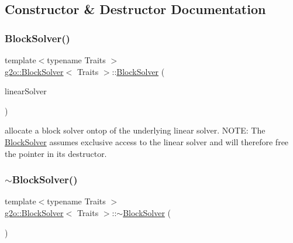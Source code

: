 \subsection{Constructor \& Destructor Documentation}
\mbox{\label{classg2o_1_1_block_solver_a04701a223a14708c9c84ce4d7e7af3f6}} 
\subsubsection{\texorpdfstring{Block\+Solver()}{BlockSolver()}}
{\footnotesize\ttfamily template$<$typename Traits $>$ \\
\mbox{\hyperlink{classg2o_1_1_block_solver}{g2o\+::\+Block\+Solver}}$<$ Traits $>$\+::\mbox{\hyperlink{classg2o_1_1_block_solver}{Block\+Solver}} (\begin{DoxyParamCaption}\item[{\mbox{\hyperlink{classg2o_1_1_block_solver_a717fa8cb1dd5a212e41d8ebef67955e6}{Linear\+Solver\+Type}} $\ast$}]{linear\+Solver }\end{DoxyParamCaption})}

allocate a block solver ontop of the underlying linear solver. N\+O\+TE\+: The \mbox{\hyperlink{classg2o_1_1_block_solver}{Block\+Solver}} assumes exclusive access to the linear solver and will therefore free the pointer in its destructor. \mbox{\label{classg2o_1_1_block_solver_a7587b13ec3494c00ad95a3d0ce7fd9a9}} 
\subsubsection{\texorpdfstring{$\sim$\+Block\+Solver()}{~BlockSolver()}}
{\footnotesize\ttfamily template$<$typename Traits $>$ \\
\mbox{\hyperlink{classg2o_1_1_block_solver}{g2o\+::\+Block\+Solver}}$<$ Traits $>$\+::$\sim$\mbox{\hyperlink{classg2o_1_1_block_solver}{Block\+Solver}} (\begin{DoxyParamCaption}{ }\end{DoxyParamCaption})}



